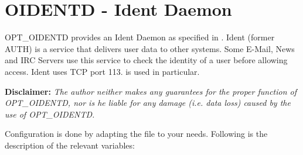 \section {OIDENTD - Ident Daemon}

OPT\_OIDENTD provides an Ident Daemon as specified in
. Ident (former AUTH) is a service that
delivers user data to other systems. Some \mbox{E-Mail}, News and
IRC Servers use this service to check the identity of a user
before allowing access. Ident uses TCP port 113.
 is used in particular.


\textbf{Disclaimer: }\emph{The author neither makes any guarantees for the proper
function of OPT\_\-OIDENTD, nor is he liable for any damage (i.e.
data loss) caused by the use of OPT\_\-OIDENTD.}



Configuration is done by adapting the file
 to your needs.
Following is the description of the relevant variables:


